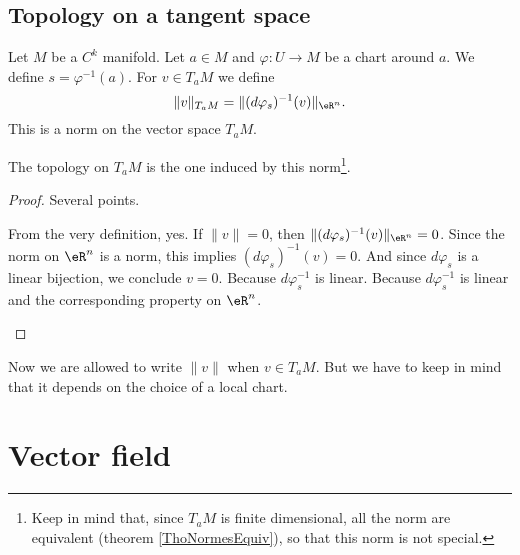 \subsection{Topology on a tangent space}

\begin{propositionDef}        \label{PROPooHJOXooMGANfd}
	Let \( M\) be a \( C^k\) manifold. Let \( a\in M\) and \( \varphi\colon U\to M\) be a chart around \( a\). We define \( s=\varphi^{-1}(a)\). For \( v\in T_aM\) we define
	\begin{equation}
		\| v \|_{T_aM}=\| (d\varphi_s)^{-1}(v) \|_{\eR^n}.
	\end{equation}
	This is a norm on the vector space \( T_aM\).

	The topology on \( T_aM\) is the one induced by this norm\footnote{Keep in mind that, since \( T_aM\) is finite dimensional, all the norm are equivalent (theorem \ref{ThoNormesEquiv}), so that this norm is not special.}.
\end{propositionDef}

\begin{proof}
	Several points.
	\begin{subproof}
		\spitem[\( \| v \|\geq 0\)]
		From the very definition, yes.
		\spitem[\( \| v \|=0\) si et seulement si \( v=0\)]
		If \( \| v \|=0\), then \( \| (d\varphi_s)^{-1}(v) \|_{\eR^n}=0\). Since the norm on \( \eR^n\) is a norm, this implies \( (d\varphi_s)^{-1}(v)=0\). And since \( d\varphi_s\) is a linear bijection, we conclude \( v=0\).
		\spitem[\( \| \lambda v \|=| \lambda |\| v \|\)]
		Because \( d\varphi_s^{-1}\) is linear.
		\spitem[\( \| v+w \|\leq \| v \|+\| v \|\)]
		Because \( d\varphi_s^{-1}\) is linear and the corresponding property on \( \eR^n\).
	\end{subproof}
\end{proof}

Now we are allowed to write \( \| v \|\) when \( v\in T_aM\). But we have to keep in mind that it depends on the choice of a local chart.

\section{Vector field}

